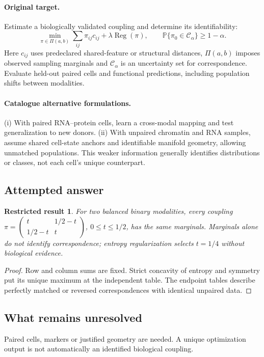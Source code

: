 \documentclass[11pt]{article}
\newcommand{\Prob}{\mathbb P}
\providecommand{\Prob}{\mathbb P}
\newtheorem{attemptresult}{Restricted result}[section]
\begin{document}
\paragraph{Original target.}
Estimate a biologically validated coupling and determine its identifiability:
\[\min_{\pi\in\Pi(a,b)}\sum_{ij}\pi_{ij}c_{ij}+\lambda\operatorname{Reg}(\pi),\qquad \Prob\{\pi_0\in\mathcal C_\alpha\}\ge1-\alpha.\]
Here $c_{ij}$ uses predeclared shared-feature or structural distances, $\Pi(a,b)$ imposes observed sampling marginals and $\mathcal C_\alpha$ is an uncertainty set for correspondence. Evaluate held-out paired cells and functional predictions, including population shifts between modalities.
\paragraph{Catalogue alternative formulations.}
(i) With paired RNA--protein cells, learn a cross-modal mapping and test generalization to new donors. (ii) With unpaired chromatin and RNA samples, assume shared cell-state anchors and identifiable manifold geometry, allowing unmatched populations. This weaker information generally identifies distributions or classes, not each cell's unique counterpart.
\subsection{Attempted answer}
\begin{attemptresult}
For two balanced binary modalities, every coupling $\pi=\left(\begin{smallmatrix}t&1/2-t\\1/2-t&t\end{smallmatrix}\right)$, $0\leq t\leq1/2$, has the same marginals. Marginals alone do not identify correspondence; entropy regularization selects $t=1/4$ without biological evidence.
\end{attemptresult}
\begin{proof}
Row and column sums are fixed. Strict concavity of entropy and symmetry put its unique maximum at the independent table. The endpoint tables describe perfectly matched or reversed correspondences with identical unpaired data.
\end{proof}
\subsection{What remains unresolved}
Paired cells, markers or justified geometry are needed. A unique optimization output is not automatically an identified biological coupling.
\end{document}
